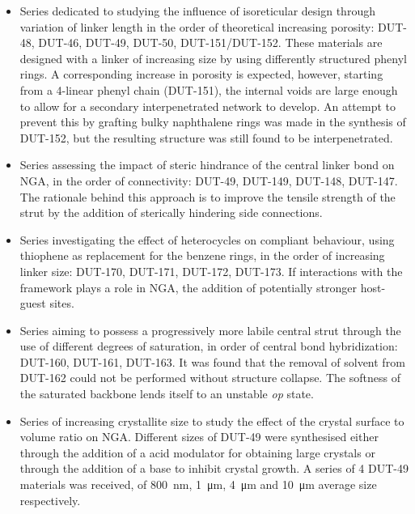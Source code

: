 \begin{itemize}
    \item Series dedicated to studying the influence of isoreticular
    design through variation of linker length in the order of 
    theoretical increasing porosity: DUT-48, DUT-46, DUT-49, 
    DUT-50, DUT-151/DUT-152. These materials are designed 
    with a linker of increasing size by using differently 
    structured phenyl rings. A corresponding increase in 
    porosity is expected, however, starting from a 4-linear
    phenyl chain (DUT-151), the internal voids are large enough to 
    allow for a secondary interpenetrated network to develop.
    An attempt to prevent this by grafting bulky naphthalene 
    rings was made in the synthesis of DUT-152, but the resulting 
    structure was still found to be interpenetrated.
    
    \item Series assessing the impact of steric hindrance of the 
    central linker bond on NGA, in the order of connectivity:
    DUT-49, DUT-149, DUT-148, DUT-147. The rationale behind this
    approach is to improve the tensile strength of the strut by 
    the addition of sterically hindering side connections.

    \item Series investigating the effect of heterocycles on compliant
    behaviour, using thiophene as replacement for the benzene rings, 
    in the order of increasing linker size: DUT-170, DUT-171, DUT-172,
    DUT-173. If interactions with the framework plays a role in NGA,
    the addition of potentially stronger host-guest sites.

    \item Series aiming to possess a progressively more labile central 
    strut through the use of different degrees of saturation,
    in order of central bond hybridization: DUT-160, DUT-161, DUT-163.
    It was found that the removal of solvent from DUT-162 could not be 
    performed without structure collapse. The softness of the saturated
    backbone lends itself to an unstable \textit{op} state.

    \item Series of increasing crystallite size to study the effect 
    of the crystal surface to volume ratio on NGA. Different sizes
    of DUT-49 were synthesised either through the addition of a 
    acid modulator for obtaining large crystals or through the addition
    of a base to inhibit crystal growth. A series of 4 DUT-49 materials
    was received, of \SI{800}{\nano\metre}, \SI{1}{\micro\metre},
    \SI{4}{\micro\metre} and \SI{10}{\micro\metre} average size 
    respectively.

\end{itemize}

